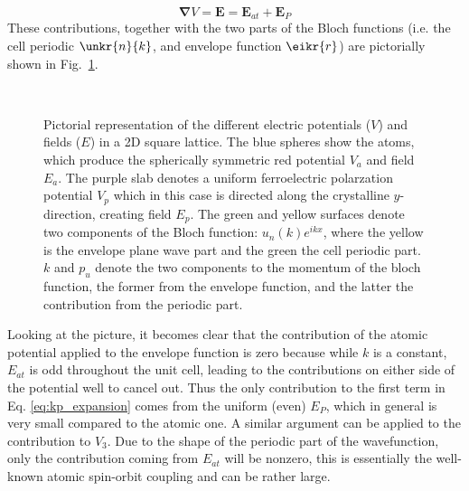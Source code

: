 \begin{equation}
	\bm{\nabla} V = \bm{E} = \bm{E}_{at} + \bm{E}_{P}
\end{equation}
These contributions, together with the two parts of the Bloch functions (i.e. the cell periodic $\unkr{n}{k}$, and envelope function $\eikr{r}$) are pictorially shown in Fig.~\ref{fig:Efield_cell_drawing}. 
\begin{figure}[h]
~\centering
{}\caption{\label{fig:Efield_cell_drawing} Pictorial representation of the different electric potentials ($V$) and fields ($E$) in a 2D square lattice. The blue spheres show the atoms, which produce the spherically symmetric red potential $V_a$ and field $E_a$. The purple slab denotes a uniform ferroelectric polarzation potential $V_p$ which in this case is directed along the crystalline $y$-direction, creating field $E_p$. The green and yellow surfaces denote two components of the Bloch function: $u_n(k) e^{ikx}$, where the yellow is the envelope plane wave part and the green the cell periodic part. $k$ and $p_u$ denote the two components to the momentum of the bloch function, the former from the envelope function, and the latter the contribution from the periodic part.}
\end{figure}

Looking at the picture, it becomes clear that the contribution of the atomic potential applied to the envelope function is zero because while $k$ is a constant, $E_{at}$ is odd throughout the unit cell, leading to the contributions on either side of the potential well to cancel out. Thus the only contribution to the first term in Eq. \ref{eq:kp_expansion} comes from the uniform (even) $E_P$, which in general is very small compared to the atomic one. A similar argument can be applied to the contribution to $V_3$. Due to the shape of the periodic part of the wavefunction, only the contribution coming from $E_{at}$ will be nonzero, this is essentially the well-known atomic spin-orbit coupling and can be rather large. 


